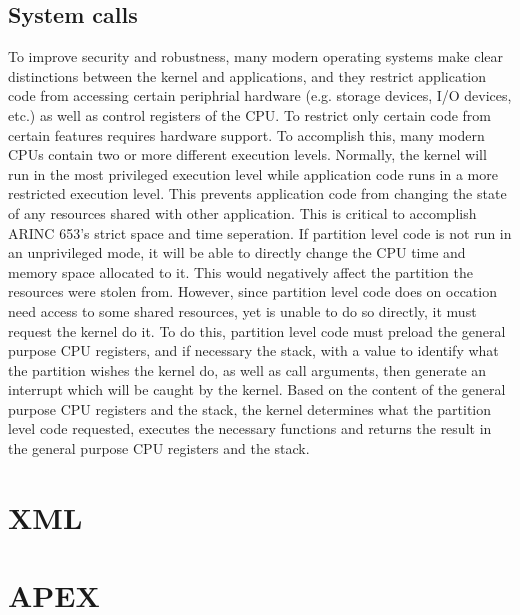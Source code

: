 \subsection{System calls}
To improve security and robustness, many modern operating systems make clear 
distinctions between the kernel and applications, and they restrict application
code from accessing certain periphrial hardware (e.g. storage devices, I/O
devices, etc.) as well as control registers of the CPU. 
To restrict only certain code from certain features requires hardware support.
To accomplish this, many modern CPUs contain two or more different execution
levels. Normally, the kernel will run in the most privileged execution level
while application code runs in a more restricted execution level. This prevents
application code from changing the state of any resources shared with other
application. This is critical to accomplish ARINC 653's strict space and time 
seperation. If partition level code is not run in an unprivileged mode, it will
be able to directly change the CPU time and memory space allocated to it. This
would negatively affect the partition the resources were stolen from. However,
since partition level code does on occation need access to some shared resources,
yet is unable to do so directly, it must request the kernel do it. To do this,
partition level code must preload the general purpose CPU registers, and if
necessary the stack, with a value to identify what the partition wishes the
kernel do, as well as call arguments, then generate an interrupt which will be
caught by the kernel. Based on the content of the general purpose CPU registers
and the stack, the kernel determines what the partition level code requested,
executes the necessary functions and returns the result in the general purpose 
CPU registers and the stack.


\section{XML}


\section{APEX}

